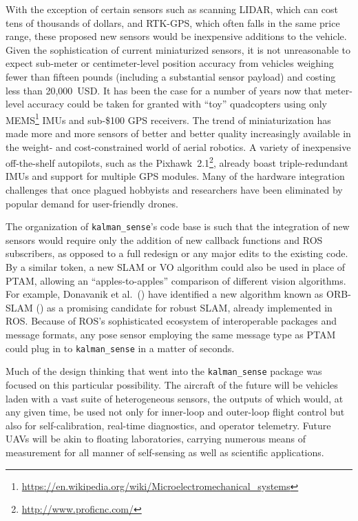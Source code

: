 With the exception of certain sensors such as scanning LIDAR, which can cost tens of thousands of dollars, and RTK-GPS, which often falls in the same price range, these proposed new sensors would be inexpensive additions to the vehicle. Given the sophistication of current miniaturized sensors, it is not unreasonable to expect sub-meter or centimeter-level position accuracy from vehicles weighing fewer than fifteen pounds (including a substantial sensor payload) and costing less than 20,000~USD. It has been the case for a number of years now that meter-level accuracy could be taken for granted with ``toy'' quadcopters using only MEMS\footnote{\url{https://en.wikipedia.org/wiki/Microelectromechanical_systems}} IMUs and sub-\$100 GPS receivers. The trend of miniaturization has made more and more sensors of better and better quality increasingly available in the weight- and cost-constrained world of aerial robotics. A variety of inexpensive off-the-shelf autopilots, such as the Pixhawk~2.1\footnote{\url{http://www.proficnc.com/}}, already boast triple-redundant IMUs and support for multiple GPS modules. Many of the hardware integration challenges that once plagued hobbyists and researchers have been eliminated by popular demand for user-friendly drones.

The organization of \texttt{kalman\_sense}'s code base is such that the integration of new sensors would require only the addition of new callback functions and ROS subscribers, as opposed to a full redesign or any major edits to the existing code. By a similar token, a new SLAM or VO algorithm could also be used in place of PTAM, allowing an ``apples-to-apples'' comparison of different vision algorithms. For example, Donavanik et al.\ (\cite{Donavanik2016}) have identified a new algorithm known as ORB-SLAM (\cite{Mur-Artal2015}) as a promising candidate for robust SLAM, already implemented in ROS. Because of ROS's sophisticated ecosystem of interoperable packages and message formats, any pose sensor employing the same message type as PTAM could plug in to \texttt{kalman\_sense} in a matter of seconds.

Much of the design thinking that went into the \texttt{kalman\_sense} package was focused on this particular possibility. The aircraft of the future will be vehicles laden with a vast suite of heterogeneous sensors, the outputs of which would, at any given time, be used not only for inner-loop and outer-loop flight control but also for self-calibration, real-time diagnostics, and operator telemetry. Future UAVs will be akin to floating laboratories, carrying numerous means of measurement for all manner of self-sensing as well as scientific applications.

